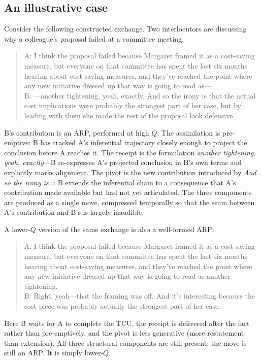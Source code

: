 \subsection{An illustrative case}

Consider the following constructed exchange. Two interlocutors are discussing why a colleague's proposal failed at a committee meeting.

\begin{quote}
A: I think the proposal failed because Margaret framed it as a cost-saving measure, but everyone on that committee has spent the last six months hearing about cost-saving measures, and they've reached the point where any new initiative dressed up that way is going to read as---\\
B: ---another tightening, yeah, exactly. And so the irony is that the actual cost implications were probably the strongest part of her case, but by leading with them she made the rest of the proposal look defensive.
\end{quote}

B's contribution is an ARP, performed at high $Q$. The assimilation is pre-emptive: B has tracked A's inferential trajectory closely enough to project the conclusion before A reaches it. The receipt is the formulation \emph{another tightening, yeah, exactly}---B re-expresses A's projected conclusion in B's own terms and explicitly marks alignment. The pivot is the new contribution introduced by \emph{And so the irony is\ldots}: B extends the inferential chain to a consequence that A's contribution made available but had not yet articulated. The three components are produced as a single move, compressed temporally so that the seam between A's contribution and B's is largely inaudible.

A lower-$Q$ version of the same exchange is also a well-formed ARP:

\begin{quote}
A: I think the proposal failed because Margaret framed it as a cost-saving measure, but everyone on that committee has spent the last six months hearing about cost-saving measures, and they've reached the point where any new initiative dressed up that way is going to read as another tightening.\\
B: Right, yeah---that the framing was off. And it's interesting because the cost piece was probably actually the strongest part of her case.
\end{quote}

Here B waits for A to complete the TCU, the receipt is delivered after the fact rather than pre-emptively, and the pivot is less generative (more restatement than extension). All three structural components are still present; the move is still an ARP. It is simply lower-$Q$.

